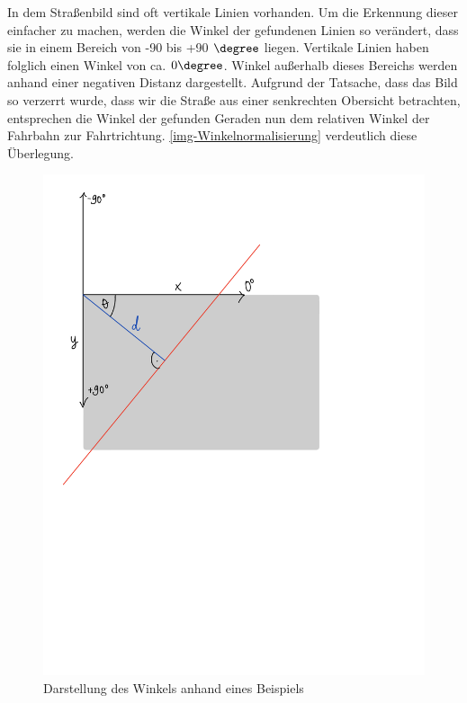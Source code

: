 \documentclass[a4paper,12pt]{report}
\begin{document}
	In dem Straßenbild sind oft vertikale Linien vorhanden.
	Um die Erkennung dieser einfacher zu machen, werden die Winkel der gefundenen Linien so verändert, dass sie in einem Bereich von -90 bis +90 $\degree$ liegen.
	Vertikale Linien haben folglich einen Winkel von ca. $0 \degree$.
	Winkel außerhalb dieses Bereichs werden anhand einer negativen Distanz dargestellt.
	Aufgrund der Tatsache, dass das Bild so verzerrt wurde, dass wir die Straße aus einer senkrechten Obersicht betrachten, entsprechen die Winkel der gefunden Geraden nun dem relativen Winkel der Fahrbahn zur Fahrtrichtung.
	\autoref{img-Winkelnormalisierung} verdeutlich diese Überlegung.
	
	\begin{figure}
		\centering
		\includegraphics[height=0.5\textheight]{assets/Winkelnormalisierung.pdf}
		\caption{Darstellung des Winkels anhand eines Beispiels}
		\label{img-Winkelnormalisierung}
	\end{figure}
\end{document}
